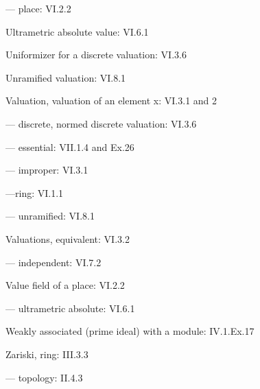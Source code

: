 --- place: VI.2.2

Ultrametric absolute value: VI.6.1

Uniformizer for a discrete valuation: VI.3.6

Unramified valuation: VI.8.1

Valuation, valuation of an element x: VI.3.1 and 2

--- discrete, normed discrete valuation: VI.3.6

--- essential: VII.1.4 and Ex.26

--- improper: VI.3.1

---ring: VI.1.1

--- unramified: VI.8.1

Valuations, equivalent: VI.3.2

--- independent: VI.7.2

Value field of a place: VI.2.2

--- ultrametric absolute: VI.6.1

Weakly associated (prime ideal) with a module: IV.1.Ex.17

Zariski, ring: III.3.3

--- topology: II.4.3

